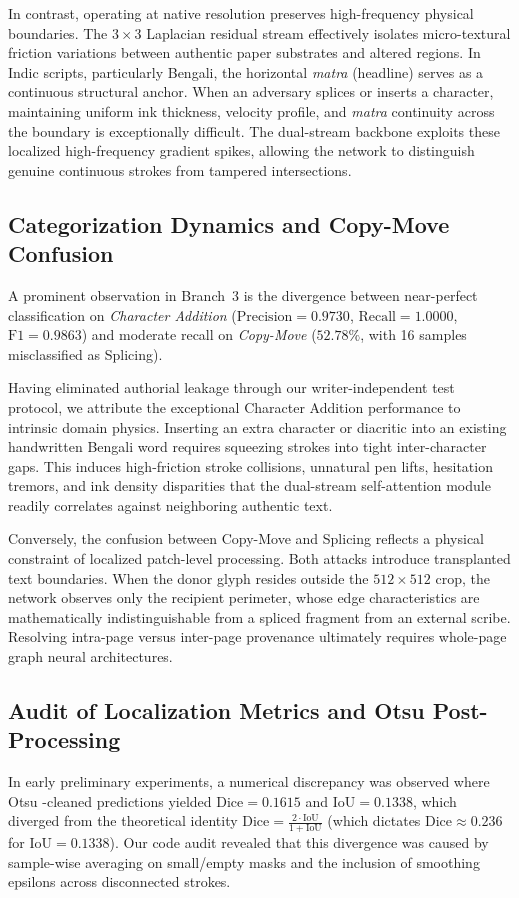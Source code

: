 \documentclass[pdflatex,sn-mathphys-num,iicol]{sn-jnl}
\begin{document}
In contrast, operating at native resolution preserves high-frequency physical boundaries. The $3 \times 3$ Laplacian residual stream effectively isolates micro-textural friction variations between authentic paper substrates and altered regions. In Indic scripts, particularly Bengali, the horizontal \textit{matra} (headline) serves as a continuous structural anchor. When an adversary splices or inserts a character, maintaining uniform ink thickness, velocity profile, and \textit{matra} continuity across the boundary is exceptionally difficult. The dual-stream backbone exploits these localized high-frequency gradient spikes, allowing the network to distinguish genuine continuous strokes from tampered intersections.

\subsection{Categorization Dynamics and Copy-Move Confusion}
A prominent observation in Branch~3 is the divergence between near-perfect classification on \textit{Character Addition} ($\text{Precision} = 0.9730$, $\text{Recall} = 1.0000$, $\text{F1} = 0.9863$) and moderate recall on \textit{Copy-Move} ($52.78\%$, with 16 samples misclassified as Splicing).

Having eliminated authorial leakage through our writer-independent test protocol, we attribute the exceptional Character Addition performance to intrinsic domain physics. Inserting an extra character or diacritic into an existing handwritten Bengali word requires squeezing strokes into tight inter-character gaps. This induces high-friction stroke collisions, unnatural pen lifts, hesitation tremors, and ink density disparities that the dual-stream self-attention module readily correlates against neighboring authentic text.

Conversely, the confusion between Copy-Move and Splicing reflects a physical constraint of localized patch-level processing. Both attacks introduce transplanted text boundaries. When the donor glyph resides outside the $512 \times 512$ crop, the network observes only the recipient perimeter, whose edge characteristics are mathematically indistinguishable from a spliced fragment from an external scribe. Resolving intra-page versus inter-page provenance ultimately requires whole-page graph neural architectures.

\subsection{Audit of Localization Metrics and Otsu Post-Processing}
In early preliminary experiments, a numerical discrepancy was observed where Otsu \cite{bib18}-cleaned predictions yielded $\text{Dice} = 0.1615$ and $\text{IoU} = 0.1338$, which diverged from the theoretical identity $\text{Dice} = \frac{2 \cdot \text{IoU}}{1 + \text{IoU}}$ (which dictates $\text{Dice} \approx 0.236$ for $\text{IoU} = 0.1338$). Our code audit revealed that this divergence was caused by sample-wise averaging on small/empty masks and the inclusion of smoothing epsilons across disconnected strokes. 
\end{document}
